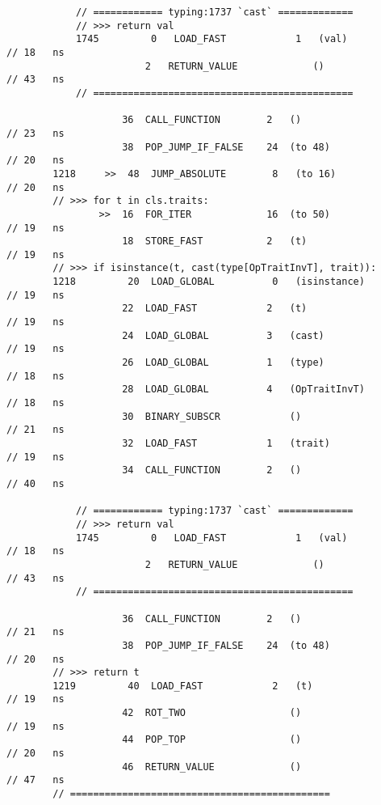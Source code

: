 \begin{code}
\begin{verbatim}
            // ============ typing:1737 `cast` =============
            // >>> return val
            1745         0   LOAD_FAST            1   (val)                                         // 18   ns
                        2   RETURN_VALUE             ()                                             // 43   ns
            // =============================================

                    36  CALL_FUNCTION        2   ()                                                 // 23   ns
                    38  POP_JUMP_IF_FALSE    24  (to 48)                                            // 20   ns
        1218     >>  48  JUMP_ABSOLUTE        8   (to 16)                                           // 20   ns
        // >>> for t in cls.traits:
                >>  16  FOR_ITER             16  (to 50)                                            // 19   ns
                    18  STORE_FAST           2   (t)                                                // 19   ns
        // >>> if isinstance(t, cast(type[OpTraitInvT], trait)):
        1218         20  LOAD_GLOBAL          0   (isinstance)                                      // 19   ns
                    22  LOAD_FAST            2   (t)                                                // 19   ns
                    24  LOAD_GLOBAL          3   (cast)                                             // 19   ns
                    26  LOAD_GLOBAL          1   (type)                                             // 18   ns
                    28  LOAD_GLOBAL          4   (OpTraitInvT)                                      // 18   ns
                    30  BINARY_SUBSCR            ()                                                 // 21   ns
                    32  LOAD_FAST            1   (trait)                                            // 19   ns
                    34  CALL_FUNCTION        2   ()                                                 // 40   ns

            // ============ typing:1737 `cast` =============
            // >>> return val
            1745         0   LOAD_FAST            1   (val)                                         // 18   ns
                        2   RETURN_VALUE             ()                                             // 43   ns
            // =============================================

                    36  CALL_FUNCTION        2   ()                                                 // 21   ns
                    38  POP_JUMP_IF_FALSE    24  (to 48)                                            // 20   ns
        // >>> return t
        1219         40  LOAD_FAST            2   (t)                                               // 19   ns
                    42  ROT_TWO                  ()                                                 // 19   ns
                    44  POP_TOP                  ()                                                 // 20   ns
                    46  RETURN_VALUE             ()                                                 // 47   ns
        // =============================================


\end{verbatim}
\end{code}

